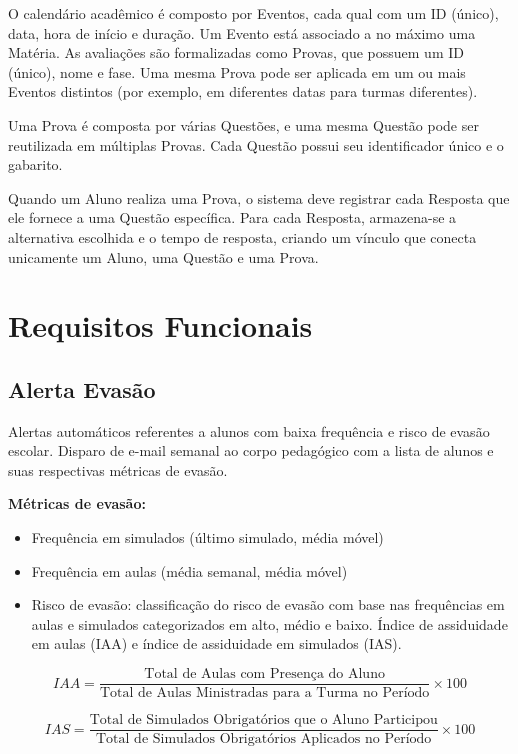 \documentclass{article}
\begin{document}
O calendário acadêmico é composto por Eventos, cada qual com um ID (único), data, hora de início e duração. Um Evento está associado a no máximo uma Matéria. As avaliações são formalizadas como Provas, que possuem um ID (único), nome e fase. Uma mesma Prova pode ser aplicada em um ou mais Eventos distintos (por exemplo, em diferentes datas para turmas diferentes).

Uma Prova é composta por várias Questões, e uma mesma Questão pode ser reutilizada em múltiplas Provas. Cada Questão possui seu identificador único e o gabarito.

Quando um Aluno realiza uma Prova, o sistema deve registrar cada Resposta que ele fornece a uma Questão específica. Para cada Resposta, armazena-se a alternativa escolhida e o tempo de resposta, criando um vínculo que conecta unicamente um Aluno, uma Questão e uma Prova.


\section{Requisitos Funcionais}

\subsection{Alerta Evasão}

Alertas automáticos referentes a alunos com baixa frequência e risco de evasão escolar. Disparo de e-mail semanal ao corpo pedagógico com a lista de alunos e suas respectivas métricas de evasão. 
\vspace{0.5cm}

\textbf{Métricas de evasão:}

\begin{itemize}
    \item Frequência em simulados (último simulado, média móvel)
    \item Frequência em aulas (média semanal, média móvel)
    \item Risco de evasão: classificação do risco de evasão com base nas frequências em aulas e simulados categorizados em alto, médio e baixo. Índice de assiduidade em aulas (IAA) e índice de assiduidade em simulados (IAS).
\end{itemize}
\[
IAA = \frac{\text{Total de Aulas com Presença do Aluno}}{\text{Total de Aulas Ministradas para a Turma no Período}} \times 100
\]

\[
IAS = \frac{\text{Total de Simulados Obrigatórios que o Aluno Participou}}{\text{Total de Simulados Obrigatórios Aplicados no Período}} \times 100
\]
\end{document}
